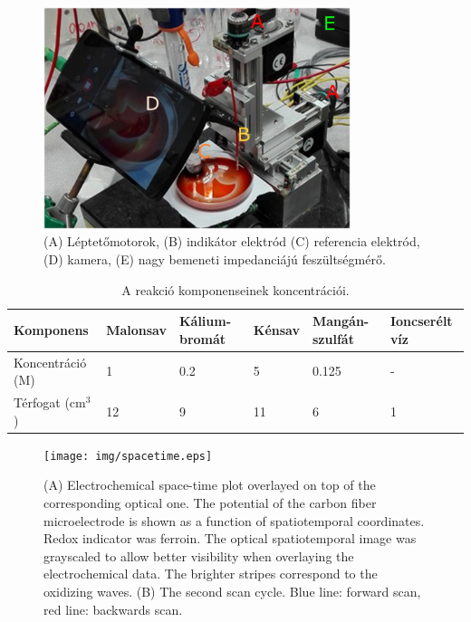\begin{figure}[h]
\centering
\includegraphics[width=0.8\textwidth]{img/secm.png}
\caption{(A) Léptetőmotorok, (B) indikátor elektród (C) referencia elektród, (D) kamera, (E) nagy bemeneti impedanciájú feszültségmérő.}
\label{fig:secm}
\end{figure}

\begin{table}[]
\centering
\caption{A reakció komponenseinek koncentrációi.}
\label{my-label}
\begin{tabular}{llllll}
Komponens                       & Malonsav & Kálium-bromát & Kénsav & Mangán-szulfát & Ioncserélt víz \\
\hline
Koncentráció (M)                & 1        & 0.2           & 5      & 0.125          & -              \\
Térfogat (cm$^3$) & 12       & 9             & 11     & 6              & 1              \\
\end{tabular}
\end{table}

\def\s{0.5}
\begin{figure}
\centering
\texttt{[image: img/spacetime.eps]}
\caption{(A) Electrochemical space-time plot overlayed on top of the corresponding optical one.
The potential of the carbon fiber microelectrode is shown as a function of spatiotemporal coordinates.
Redox indicator was ferroin.
The optical spatiotemporal image was grayscaled to allow better visibility when overlaying the electrochemical data.
The brighter stripes correspond to the oxidizing waves.
(B) The second scan cycle.
Blue line: forward scan, red line: backwards scan.
}
\label{fig:spatiotemporal}
\end{figure}




